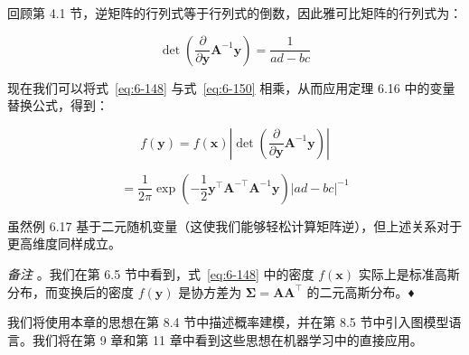 \begin{notebox}
回顾第 4.1 节，逆矩阵的行列式等于行列式的倒数，因此雅可比矩阵的行列式为：

\begin{equation}
\det \left( \frac{\partial}{\partial \boldsymbol{y}} \boldsymbol{A}^{-1}\boldsymbol{y} \right) = \frac{1}{ad - bc}
\tag{6.150}\label{eq:6-150}
\end{equation}

现在我们可以将式~\eqref{eq:6-148} 与式~\eqref{eq:6-150} 相乘，从而应用定理 6.16 中的变量替换公式，得到：

\begin{equation}
f(\boldsymbol{y}) = f(\boldsymbol{x}) \left| \det \left( \frac{\partial}{\partial \boldsymbol{y}} \boldsymbol{A}^{-1}\boldsymbol{y} \right) \right|
\tag{6.151a}\label{eq:6-151a}
\end{equation}

\begin{equation}
= \frac{1}{2\pi} \exp \left( -\frac{1}{2} \boldsymbol{y}^\top \boldsymbol{A}^{-\top} \boldsymbol{A}^{-1} \boldsymbol{y} \right) |ad - bc|^{-1}
\tag{6.151b}\label{eq:6-151b}
\end{equation}
\end{notebox}

虽然例 6.17 基于二元随机变量（这使我们能够轻松计算矩阵逆），但上述关系对于更高维度同样成立。

\emph{备注} 。我们在第 6.5 节中看到，式~\eqref{eq:6-148} 中的密度 $ f(\boldsymbol{x}) $ 实际上是标准高斯分布，而变换后的密度 $ f(\boldsymbol{y}) $ 是协方差为 $ \boldsymbol{\Sigma} = \boldsymbol{A} \boldsymbol{A}^\top $ 的二元高斯分布。♦

我们将使用本章的思想在第 8.4 节中描述概率建模，并在第 8.5 节中引入图模型语言。我们将在第 9 章和第 11 章中看到这些思想在机器学习中的直接应用。
